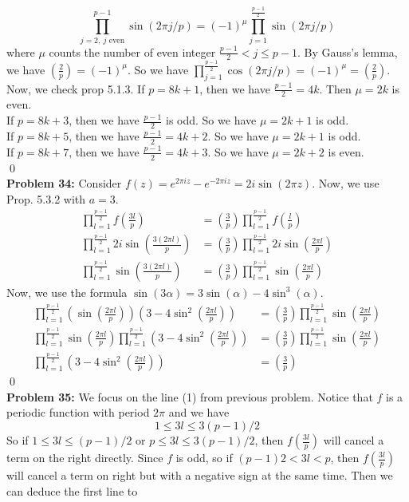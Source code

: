 \documentclass[12pt]{amsart}
\begin{document}
\[\prod_{j=2,\ j \text{ even}}^{p-1}\sin(2\pi j/p)=(-1)^{\mu}\prod_{j=1}^\frac{p-1}{2}\sin(2\pi j/p)\]
where $\mu$ counts the number of even integer $\frac{p-1}{2}<j\leq p-1$. By Gauss's lemma, we have $(\frac{2}{p})=(-1)^\mu$.
So we have $\prod_{j=1}^{\frac{p-1}{2}}\cos(2\pi j/p)=(-1)^\mu=(\frac{2}{p})$.\\
Now, we check prop 5.1.3. If $p=8k+1$, then we have $\frac{p-1}{2}=4k$. Then $\mu =2k$ is even.\\
If $p=8k+3$, then we have $\frac{p-1}{2}$ is odd. So we have $\mu =2k+1$ is odd.\\
If $p=8k+5$, then we have $\frac{p-1}{2}=4k+2$. So we have $\mu =2k+1$ is odd.\\
If $p=8k+7$, then we have $\frac{p-1}{2}=4k+3$. So we have $\mu= 2k+2$ is even.\\
\qed\\
\textbf{Problem 34:} Consider $f(z)=e^{2\pi i z}-e^{-2\pi i z}=2i\sin(2\pi z)$. Now, we use Prop. 5.3.2 with $a=3$. 
\begin{align*}
    \prod_{l=1}^{\frac{p-1}{2}}f(\frac{3l}{p})&=(\frac{3}{p})\prod_{l=1}^{\frac{p-1}{2}}f(\frac{l}{p})\tag{1}\\
    \prod_{l=1}^{\frac{p-1}{2}}2i\sin(\frac{3(2\pi l)}{p})&=(\frac{3}{p})\prod_{l=1}^{\frac{p-1}{2}}2i\sin(\frac{2\pi l}{p})\\
    \prod_{l=1}^{\frac{p-1}{2}}\sin(\frac{3(2\pi l)}{p})&=(\frac{3}{p})\prod_{l=1}^{\frac{p-1}{2}}\sin(\frac{2\pi l}{p})
\end{align*}
Now, we use the formula $\sin(3\alpha)=3\sin(\alpha)-4\sin^3(\alpha)$.
\begin{align*}
    \prod_{l=1}^{\frac{p-1}{2}}(\sin(\frac{2\pi l}{p}))(3-4\sin^2(\frac{2\pi l}{p})) &=(\frac{3}{p})\prod_{l=1}^{\frac{p-1}{2}}\sin(\frac{2\pi l}{p})\\
    \prod_{l=1}^{\frac{p-1}{2}}\sin(\frac{2\pi l}{p})\prod_{l=1}^{\frac{p-1}{2}}(3-4\sin^2(\frac{2\pi l}{p}) )&=(\frac{3}{p})\prod_{l=1}^{\frac{p-1}{2}}\sin(\frac{2\pi l}{p})\\
    \prod_{l=1}^{\frac{p-1}{2}}(3-4\sin^2(\frac{2\pi l}{p})) &=(\frac{3}{p})
\end{align*}
\qed\\
\textbf{Problem 35:} We focus on the line (1) from previous problem. Notice that $f$ is a periodic function with period $2\pi$ and we have 
\[1\leq 3l\leq 3(p-1)/2\]
So if $1\leq 3l\leq (p-1)/2$ or $p\leq 3l\leq 3(p-1)/2$, then $f(\frac{3l}{p})$ will cancel a term on the right directly. Since $f$ is odd, so if $(p-1)2<3l<p$, then $f(\frac{3l}{p})$ will cancel a term on right but with a negative sign at the same time. Then we can deduce the first line to 
\end{document}
